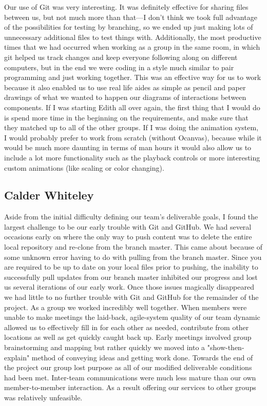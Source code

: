 \documentclass[12pt]{article}
\begin{document}
\begin{changemargin}{1cm}{0cm}
	Our use of Git was very interesting. It was definitely effective for sharing files between us, but not much more than that—I don’t think we took full advantage of the possibilities for testing by branching, so we ended up just making lots of unnecessary additional files to test things with. Additionally, the most productive times that we had occurred when working as a group in the same room, in which git helped us track changes and keep everyone following along on different computers, but in the end we were coding in a style much similar to pair programming and just working together. This was an effective way for us to work because it also enabled us to use real life aides as simple as pencil and paper drawings of what we wanted to happen our diagrams of interactions between components. 
	If I was starting Edith all over again, the first thing that I would do is spend more time in the beginning on the requirements, and make sure that they matched up to all of the other groups. If I was doing the animation system, I would probably prefer to work from scratch (without Ocanvas), because while it would be much more daunting in terms of man hours it would also allow us to include a lot more functionality such as the playback controls or more interesting custom animations (like scaling or color changing). 
\end{changemargin} 
\subsection{Calder Whiteley}
\begin{changemargin}{1cm}{0cm} 
Aside from the initial  difficulty defining our team's deliverable goals, I found the largest challenge to be our early trouble with Git and GitHub.
We had several occasions early on where the only way to push content was to delete the entire local repository and re-clone from the 
branch master.  This came about because of some unknown error having to do with pulling from the branch master.  Since you are 
required to be up to date on your local files prior to pushing, the inability to successfully pull updates from our branch master inhibited 
our progress and lost us several iterations of our early work.  Once those issues magically disappeared we had little to no further trouble 
with Git and GitHub for the remainder of the project.
As a group we worked incredibly well together.  When members were unable to make meetings the laid-back, agile-system quality of our 
team dynamic allowed us to effectively fill in for each other as needed, contribute from other locations as well as get quickly caught back up.
Early meetings involved group brainstorming and mapping but rather quickly we moved into a "show-then-explain" method of conveying ideas 
and getting work done.
Towards the end of the project our group lost purpose as all of our modified deliverable conditions had been met.  Inter-team communications 
were much less mature than our own member-to-member interaction.  As a result offering our services to other groups was relatively unfeasible.
\end{changemargin} 
\end{document}
